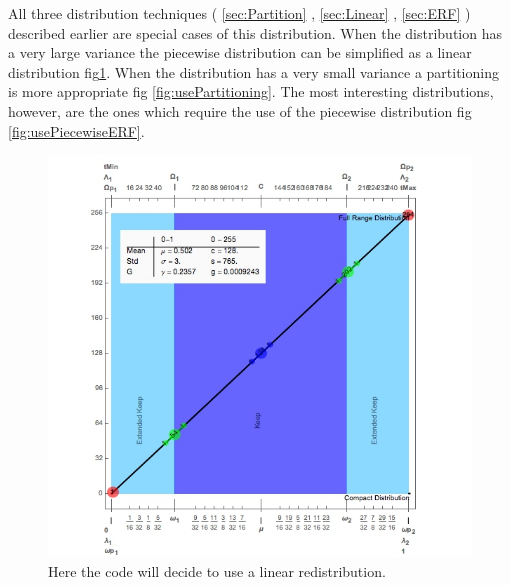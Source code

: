 All three distribution techniques ( \ref{sec:Partition} , \ref{sec:Linear} , \ref{sec:ERF} ) described earlier are special cases of this distribution. When the distribution has a very large variance the piecewise distribution can be simplified as a linear distribution fig\ref{fig:useLinear}. When the distribution has a very small variance a partitioning is more appropriate fig \ref{fig:usePartitioning}. The most interesting distributions, however, are the ones which require the use of the piecewise distribution fig \ref{fig:usePiecewiseERF}. 

\begin{figure}[h]
\centering
\includegraphics[width=1\linewidth]{Chapter2/Figs/useLinear}
\caption{Here the code will decide to use a linear redistribution.}
\label{fig:useLinear}
\end{figure}

